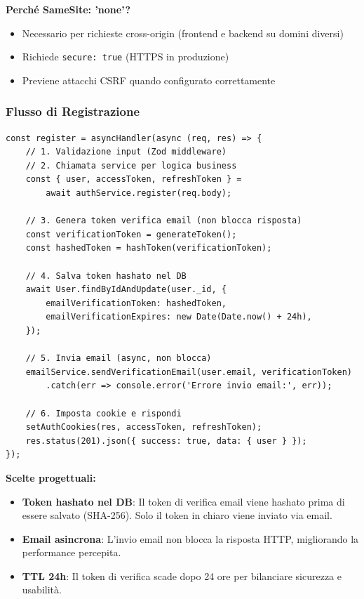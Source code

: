 \documentclass[11pt,a4paper]{article}
\newcommand{\code}[1]{\texttt{#1}}
\begin{document}
\textbf{Perché SameSite: 'none'?}
\begin{itemize}
    \item Necessario per richieste cross-origin (frontend e backend su domini diversi)
    \item Richiede \code{secure: true} (HTTPS in produzione)
    \item Previene attacchi CSRF quando configurato correttamente
\end{itemize}

\subsubsection{Flusso di Registrazione}

\begin{lstlisting}[caption=Registrazione Utente]
const register = asyncHandler(async (req, res) => {
    // 1. Validazione input (Zod middleware)
    // 2. Chiamata service per logica business
    const { user, accessToken, refreshToken } = 
        await authService.register(req.body);

    // 3. Genera token verifica email (non blocca risposta)
    const verificationToken = generateToken();
    const hashedToken = hashToken(verificationToken);
    
    // 4. Salva token hashato nel DB
    await User.findByIdAndUpdate(user._id, {
        emailVerificationToken: hashedToken,
        emailVerificationExpires: new Date(Date.now() + 24h),
    });

    // 5. Invia email (async, non blocca)
    emailService.sendVerificationEmail(user.email, verificationToken)
        .catch(err => console.error('Errore invio email:', err));

    // 6. Imposta cookie e rispondi
    setAuthCookies(res, accessToken, refreshToken);
    res.status(201).json({ success: true, data: { user } });
});
\end{lstlisting}

\textbf{Scelte progettuali:}
\begin{itemize}
    \item \textbf{Token hashato nel DB}: Il token di verifica email viene hashato prima di essere salvato (SHA-256). Solo il token in chiaro viene inviato via email.
    \item \textbf{Email asincrona}: L'invio email non blocca la risposta HTTP, migliorando la performance percepita.
    \item \textbf{TTL 24h}: Il token di verifica scade dopo 24 ore per bilanciare sicurezza e usabilità.
\end{itemize}
\end{document}
